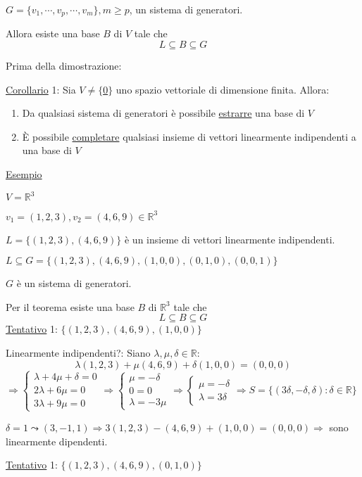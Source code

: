 \documentclass{article}
\newcommand{\ul}[1]{\underline{#1}}
\newcommand{\R}{\mathbb{R}}
\begin{document}
$G=\{v_1,\cdots,v_p,\cdots,v_m\},m\ge p$, un sistema di generatori.

Allora esiste una base $B$ di $V$ tale che
$$L\subseteq B\subseteq G$$

Prima della dimostrazione:

\ul{Corollario} 1: Sia $V\not=\{$\ul{0}$\}$ uno spazio vettoriale di dimensione finita. Allora:
\begin{enumerate}
	\item Da qualsiasi sistema di generatori è possibile \ul{estrarre} una base di $V$
	\item È possibile \ul{completare} qualsiasi insieme di vettori linearmente indipendenti a una base di $V$
\end{enumerate}

\ul{Esempio}

$V=\R^3$

$v_1=(1,2,3),v_2=(4,6,9)\in\R^3$

$L=\{(1,2,3),(4,6,9)\}$ è un insieme di vettori linearmente indipendenti.

$L\subseteq G=\{(1,2,3),(4,6,9),(1,0,0),(0,1,0),(0,0,1)\}$

$G$ è un sistema di generatori.

Per il teorema esiste una base $B$ di $\R^3$ tale che
$$L\subseteq B\subseteq G$$
\ul{Tentativo} 1: $\{(1,2,3),(4,6,9),(1,0,0)\}$

Linearmente indipendenti?: Siano $\lambda,\mu,\delta\in\R:$
$$\lambda(1,2,3)+\mu(4,6,9)+\delta(1,0,0)=(0,0,0)$$
$\Rightarrow\begin{cases}
		\lambda+4\mu+\delta=0 \\
		2\lambda+6\mu=0       \\
		3\lambda+9\mu=0
	\end{cases}\Rightarrow
	\begin{cases}
		\mu=-\delta \\
		0=0         \\
		\lambda=-3\mu
	\end{cases}\Rightarrow
	\begin{cases}
		\mu=-\delta \\
		\lambda=3\delta
	\end{cases}\Rightarrow
	S=\{(3\delta,-\delta,\delta):\delta\in\R\}$

$\delta=1\leadsto(3,-1,1)\Rightarrow3(1,2,3)-(4,6,9)+(1,0,0)=(0,0,0)\Rightarrow$ sono linearmente dipendenti.

\ul{Tentativo} 1: $\{(1,2,3),(4,6,9),(0,1,0)\}$
\end{document}
